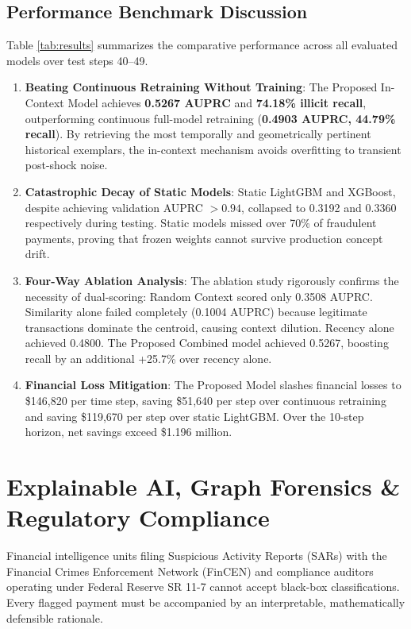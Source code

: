 \documentclass[conference]{IEEEtran}
\begin{document}
\subsection{Performance Benchmark Discussion}
Table \ref{tab:results} summarizes the comparative performance across all evaluated models over test steps 40--49.
\begin{enumerate}
    \item \textbf{Beating Continuous Retraining Without Training}: The Proposed In-Context Model achieves \textbf{0.5267 AUPRC} and \textbf{74.18\% illicit recall}, outperforming continuous full-model retraining (\textbf{0.4903 AUPRC, 44.79\% recall}). By retrieving the most temporally and geometrically pertinent historical exemplars, the in-context mechanism avoids overfitting to transient post-shock noise.
    \item \textbf{Catastrophic Decay of Static Models}: Static LightGBM and XGBoost, despite achieving validation AUPRC $>0.94$, collapsed to 0.3192 and 0.3360 respectively during testing. Static models missed over 70\% of fraudulent payments, proving that frozen weights cannot survive production concept drift.
    \item \textbf{Four-Way Ablation Analysis}: The ablation study rigorously confirms the necessity of dual-scoring:
    Random Context scored only 0.3508 AUPRC. Similarity alone failed completely (0.1004 AUPRC) because legitimate transactions dominate the centroid, causing context dilution. Recency alone achieved 0.4800. The Proposed Combined model achieved 0.5267, boosting recall by an additional +25.7\% over recency alone.
    \item \textbf{Financial Loss Mitigation}: The Proposed Model slashes financial losses to \$146,820 per time step, saving \$51,640 per step over continuous retraining and saving \$119,670 per step over static LightGBM. Over the 10-step horizon, net savings exceed \$1.196 million.
\end{enumerate}

\section{Explainable AI, Graph Forensics \& Regulatory Compliance}
Financial intelligence units filing Suspicious Activity Reports (SARs) with the Financial Crimes Enforcement Network (FinCEN) and compliance auditors operating under Federal Reserve SR 11-7 cannot accept black-box classifications. Every flagged payment must be accompanied by an interpretable, mathematically defensible rationale. 
\end{document}
